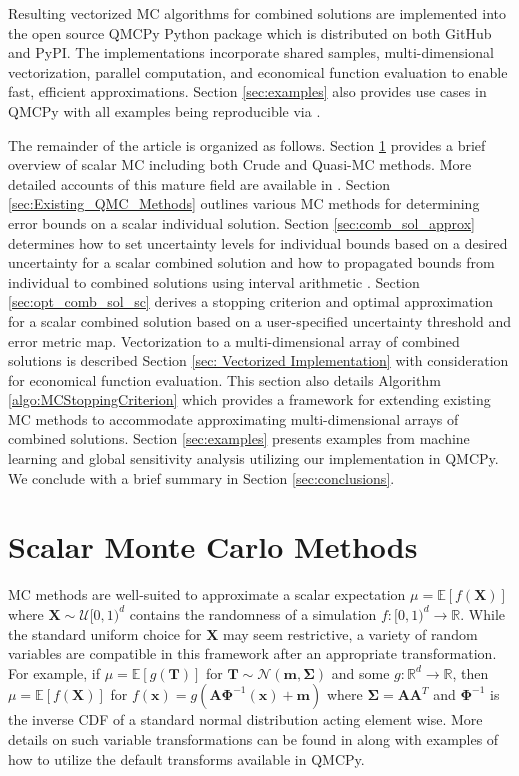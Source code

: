 \documentclass[graybox]{svmult}
\begin{document}
Resulting vectorized MC algorithms for combined solutions are implemented into the open source QMCPy Python package \cite{QMCPy} which is distributed on both GitHub and PyPI. The implementations incorporate shared samples, multi-dimensional vectorization, parallel computation, and economical function evaluation to enable fast, efficient approximations. Section \ref{sec:examples} also provides use cases in QMCPy with all examples being reproducible via \cite{vectorized_qmc_demo_notebook}.

The remainder of the article is organized as follows. Section \ref{sec:MCM} provides a brief overview of scalar MC including both Crude and Quasi-MC methods. More detailed accounts of this mature field are available in \cite{niederreiter1992random,mcbook}. Section \ref{sec:Existing_QMC_Methods} outlines various MC methods for determining error bounds on a scalar individual solution. Section \ref{sec:comb_sol_approx} determines how to set uncertainty levels for individual bounds based on a desired uncertainty for a scalar combined solution and how to propagated bounds from individual to combined solutions using interval arithmetic \cite{interval_analysis}. Section \ref{sec:opt_comb_sol_sc} derives a stopping criterion and optimal approximation for a scalar combined solution based on a user-specified uncertainty threshold and error metric map. Vectorization to a multi-dimensional array of combined solutions is described Section \ref{sec: Vectorized Implementation} with consideration for economical function evaluation. This section also details Algorithm \ref{algo:MCStoppingCriterion} which provides a framework for extending existing MC methods to accommodate approximating multi-dimensional arrays of combined solutions. Section \ref{sec:examples} presents examples from machine learning and global sensitivity analysis utilizing our implementation in QMCPy. We conclude with a brief summary in Section \ref{sec:conclusions}.   

\section{Scalar Monte Carlo Methods} \label{sec:MCM}

MC methods are well-suited to approximate a scalar expectation $\mu = \mathbb{E}[f(\boldsymbol{X})]$ where $\boldsymbol{X} \sim \mathcal{U}[0,1)^d$ contains the randomness of a simulation $f: [0,1)^{d} \to \mathbb{R}$. While the standard uniform choice for $\boldsymbol{X}$ may seem restrictive, a variety of random variables are compatible in this framework after an appropriate transformation. For example, if $\mu = \mathbb{E}[g(\boldsymbol{T})]$ for $\boldsymbol{T} \sim \mathcal{N}(\boldsymbol{m},\boldsymbol{\Sigma})$ and some $g: \mathbb{R}^{d} \to \mathbb{R}$, then $\mu = \mathbb{E}[f(\boldsymbol{X})]$ for  $f(\boldsymbol{x})=g(\boldsymbol{A}\boldsymbol{\Phi}^{-1}(\boldsymbol{x})+\boldsymbol{m})$ where $\boldsymbol{\Sigma}=\boldsymbol{A}\boldsymbol{A}^T$ and $\boldsymbol{\Phi}^{-1}$ is the inverse CDF of a standard normal distribution acting element wise. More details on such variable transformations can be found in \cite{QMCSoftware} along with examples of how to utilize the default transforms available in QMCPy.
\end{document}
